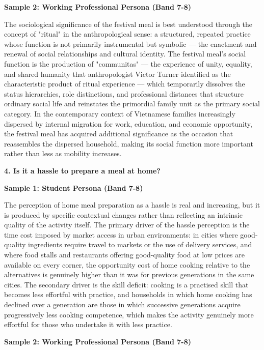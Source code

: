 \textbf{Sample 2: Working Professional Persona (Band 7-8)}

The sociological significance of the festival meal is best understood through the concept of "ritual" in the anthropological sense: a structured, repeated practice whose function is not primarily instrumental but symbolic — the enactment and renewal of social relationships and cultural identity. The festival meal's social function is the production of "communitas" — the experience of unity, equality, and shared humanity that anthropologist Victor Turner identified as the characteristic product of ritual experience — which temporarily dissolves the status hierarchies, role distinctions, and professional distances that structure ordinary social life and reinstates the primordial family unit as the primary social category. In the contemporary context of Vietnamese families increasingly dispersed by internal migration for work, education, and economic opportunity, the festival meal has acquired additional significance as the occasion that reassembles the dispersed household, making its social function more important rather than less as mobility increases.

\separator

\begin{ieltsquestion}
\textbf{4. Is it a hassle to prepare a meal at home?}
\end{ieltsquestion}
\textbf{Sample 1: Student Persona (Band 7-8)}

The perception of home meal preparation as a hassle is real and increasing, but it is produced by specific contextual changes rather than reflecting an intrinsic quality of the activity itself. The primary driver of the hassle perception is the time cost imposed by market access in urban environments: in cities where good-quality ingredients require travel to markets or the use of delivery services, and where food stalls and restaurants offering good-quality food at low prices are available on every corner, the opportunity cost of home cooking relative to the alternatives is genuinely higher than it was for previous generations in the same cities. The secondary driver is the skill deficit: cooking is a practised skill that becomes less effortful with practice, and households in which home cooking has declined over a generation are those in which successive generations acquire progressively less cooking competence, which makes the activity genuinely more effortful for those who undertake it with less practice.

\textbf{Sample 2: Working Professional Persona (Band 7-8)}


